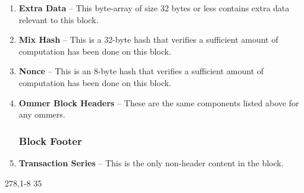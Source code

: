 \documentclass[10pt,a4paper,oneside]{scrartcl}
\begin{document}
\begin{enumerate}
                                        \item \textbf{Extra Data} -- This byte-array of size 32 bytes or less contains extra data relevant to this block.
                                        \item \textbf{Mix Hash} -- This is a 32-byte hash that verifies a sufficient amount of computation has been done on this block.
                                        \item \textbf{Nonce} -- This is an 8-byte hash that verifies a sufficient amount of computation has been done on this block.
                                        \item \textbf{Ommer Block Headers} -- These are the same components listed above for any ommers.

                                        \subsubsection{Block Footer}
                                        \item \textbf{Transaction Series} -- This is the only non-header content in the block.
                                \end{enumerate}
                                                                                                                                     278,1-8       35%
\end{document}
